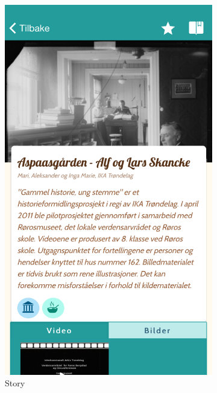 \begin{appendices}
\begin{figure}[h]
\begin{subfigure}[h]{0.3\textwidth}
			\includegraphics[width=\textwidth]{fig/screenshot_story}
			\caption{Story}
		\end{subfigure}
		\begin{subfigure}[h]{0.3\textwidth}

\end{subfigure}
\end{figure}
\end{appendices}
